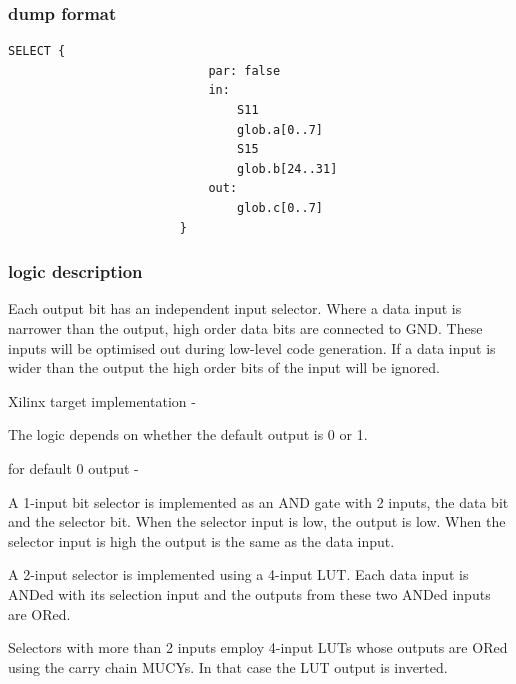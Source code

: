 \documentclass[10pt,a4paper,twoside,fleqn]{book}
\begin{document}
                \subsubsection{dump format}

                    \begin{lstlisting}[gobble=20, language=tde]
                        SELECT {
                            par: false
                            in:
                                S11
                                glob.a[0..7]
                                S15
                                glob.b[24..31]
                            out:
                                glob.c[0..7]
                        }
                    \end{lstlisting}

                \subsubsection{logic description}

                    Each output bit has an independent input selector. Where a
                    data input is narrower than the output, high order data bits
                    are connected to GND. These inputs will be optimised out during
                    low-level code generation. If a data input is wider than the
                    output the high order bits of the input will be ignored.

                    Xilinx target implementation -
                    
                    The logic depends on whether the default output is 0 or 1.
                    
                    for default 0 output -

                    A 1-input bit selector is implemented as an AND gate with 2
                    inputs, the data bit and the selector bit. When the selector
                    input is low, the output is low. When the selector input is
                    high the output is the same as the data input.

                    A 2-input selector is implemented using a 4-input LUT. Each
                    data input is ANDed with its selection input and the outputs
                    from these two ANDed inputs are ORed. 

                    Selectors with more than 2 inputs employ 4-input LUTs whose
                    outputs are ORed using the carry chain MUCYs. In that case
                    the LUT output is inverted.
\end{document}
